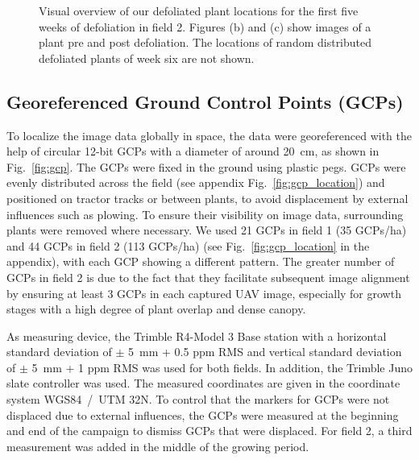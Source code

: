 \documentclass{article}
\def\figref#1{Fig.~\ref{#1}}
\begin{document}
\begin{figure}
    \centering
     \begin{minipage}{0.6\textwidth}
    \end{minipage}
    \centering
    \begin{minipage}{0.38\textwidth}
     	\subfloat[Pre defoliation plant.]{
        \texttt{[image: 2020\_10\_27\_Def\_day1\_1]}%
        \label{fig:example_defoliation_pre}}
        
        \subfloat[Post defoliation plant.]{
         \texttt{[image: 2020\_10\_27\_post\_Def\_day1\_1]}%
         \label{fig:example_defoliation_post}}
     \end{minipage}
    \caption{Visual overview of our defoliated plant locations for the first five weeks of defoliation in field 2. Figures (b) and (c) show images of a plant pre and post defoliation. The locations of random distributed defoliated plants of week six are not shown.}
    \label{fig:example_defoliation}
\end{figure}


\subsection{Georeferenced Ground Control Points (GCPs)}
To localize the image data globally in space, the data were georeferenced with the help of circular 12-bit GCPs with a diameter of around \SI{20}{\cm}, as shown in \figref{fig:gcp}. The GCPs were fixed in the ground using plastic pegs. 
GCPs were evenly distributed across the field (see appendix \figref{fig:gcp_location}) and positioned on tractor tracks or between plants, to avoid displacement by external influences such as plowing. To ensure their visibility on image data, surrounding plants were removed where necessary.
%
We used 21 GCPs in field 1 (35 GCPs/ha) and 44 GCPs in field 2 (113 GCPs/ha) (see \figref{fig:gcp_location} in the appendix), with each GCP showing a different pattern. The greater number of GCPs in field 2 is due to the fact that they facilitate subsequent image alignment by ensuring at least 3 GCPs in each captured UAV image, especially for growth stages with a high degree of plant overlap and dense canopy. 

As measuring device, the Trimble R4-Model 3 Base station with a horizontal standard deviation of $\pm$ \SI{5}{\milli\meter} + 0.5 ppm RMS and vertical standard deviation of $\pm$ \SI{5}{\milli\meter} + 1 ppm RMS was used for both fields. In addition, the Trimble Juno slate controller was used. The measured coordinates are given in the coordinate system WGS84~/~UTM 32N.
To control that the markers for GCPs were not displaced due to external influences, the GCPs were measured at the beginning and end of the campaign to dismiss GCPs that were displaced. For field 2, a third measurement was added in the middle of the growing period.
\end{document}
